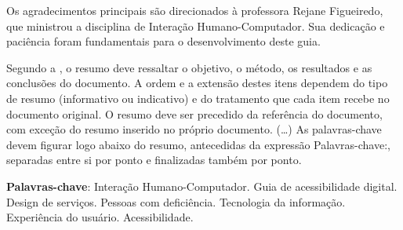 \documentclass[
  12pt,
  openright,
  twoside,
  a4paper,
  english,
  french,
  spanish,
  brazil
]{abntex2}
\begin{document}
\frenchspacing

\pretextual
\imprimircapa
\imprimirfolhaderosto*

\begin{agradecimentos}
  Os agradecimentos principais são direcionados à professora Rejane Figueiredo,
  que ministrou a disciplina de Interação Humano-Computador. Sua dedicação e
  paciência foram fundamentais para o desenvolvimento deste guia.
\end{agradecimentos}


\setlength{\absparsep}{18pt} %
\begin{resumo}
 Segundo a , o resumo deve ressaltar o
 objetivo, o método, os resultados e as conclusões do documento. A ordem e a extensão
 destes itens dependem do tipo de resumo (informativo ou indicativo) e do
 tratamento que cada item recebe no documento original. O resumo deve ser
 precedido da referência do documento, com exceção do resumo inserido no
 próprio documento. (\ldots) As palavras-chave devem figurar logo abaixo do
 resumo, antecedidas da expressão Palavras-chave:, separadas entre si por
 ponto e finalizadas também por ponto.

  \textbf{Palavras-chave}:
  Interação Humano-Computador. Guia de acessibilidade digital. Design de
  serviços. Pessoas com deficiência. Tecnologia da informação. Experiência do
  usuário. Acessibilidade.
\end{resumo}

\cleardoublepage
\end{document}
